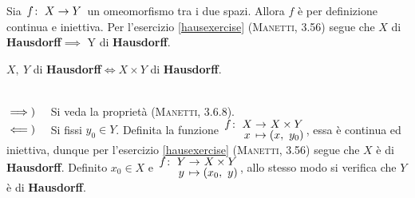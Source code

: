 \begin{demonstration}
Sia $\funz{f}{X}{Y}$ un omeomorfismo tra i due spazi. Allora $f$ è per definizione continua e iniettiva. Per l'esercizio \ref{hausexercise} \textsc{(Manetti, 3.56)} segue che $X$ di \textbf{Hausdorff}$\implies$ Y di \textbf{Hausdorff}.
\end{demonstration}
\begin{theorema}
$X,\ Y$ di \textbf{Hausdorff}$\iff X\times Y$ di \textbf{Hausdorff}.
\end{theorema}
\begin{demonstration}~{}\\
$\implies)\quad$ Si veda la proprietà \label{prodottihause} \textsc{(Manetti, 3.6.8)}.\\
$\impliedby)\quad$ Si fissi $y_0\in Y$. Definita la funzione $\funztot{f}{X}{X\times Y}{x}{\left(x,\ y_0\right)}$, essa è continua ed iniettiva, dunque per l'esercizio \ref{hausexercise} \textsc{(Manetti, 3.56)} segue che $X$ è di \textbf{Hausdorff}. Definito $x_0\in X$ e $\funztot{f}{Y}{X\times Y}{y}{\left(x_0,\ y\right)}$, allo stesso modo si verifica che $Y$ è di \textbf{Hausdorff}.
\end{demonstration}